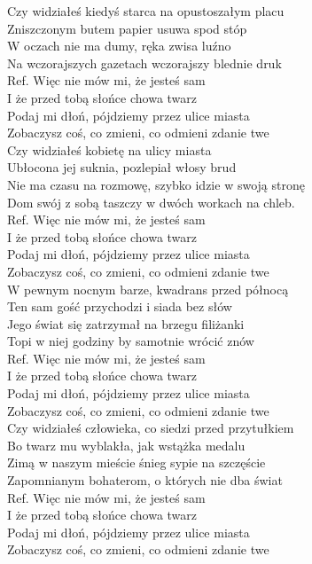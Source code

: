 
Czy widziałeś kiedyś starca na opustoszałym placu  \\
Zniszczonym butem papier usuwa spod stóp  \tab{} \\
W oczach nie ma dumy, ręka zwisa luźno  \tab{}  \\
Na wczorajszych gazetach wczorajszy blednie druk  \\
\hops
Ref. Więc nie mów mi, że jesteś sam  \tab{} \\
 I że przed tobą słońce chowa twarz  \tab{} \\
 Podaj mi dłoń, pójdziemy przez ulice miasta   \\
 Zobaczysz coś, co zmieni, co odmieni zdanie twe \\
\hops
Czy widziałeś kobietę na ulicy miasta \\
Ubłocona jej suknia, pozlepiał włosy brud \\
Nie ma czasu na rozmowę, szybko idzie w swoją stronę \\
Dom swój z sobą taszczy w dwóch workach na chleb. \\
\hops
Ref. Więc nie mów mi, że jesteś sam\\
 I że przed tobą słońce chowa twarz \\
 Podaj mi dłoń, pójdziemy przez ulice miasta \\
 Zobaczysz coś, co zmieni, co odmieni zdanie twe \\
\hops
W pewnym nocnym barze, kwadrans przed północą \\
Ten sam gość przychodzi i siada bez słów \\
Jego świat się zatrzymał na brzegu filiżanki \\
Topi w niej godziny by samotnie wrócić znów \\
\hops
Ref. Więc nie mów mi, że jesteś sam\\
 I że przed tobą słońce chowa twarz \\
 Podaj mi dłoń, pójdziemy przez ulice miasta \\
 Zobaczysz coś, co zmieni, co odmieni zdanie twe \\
\hops
Czy widziałeś człowieka, co siedzi przed przytułkiem \\
Bo twarz mu wyblakła,  jak wstążka medalu \\
Zimą w naszym mieście śnieg sypie na szczęście \\
Zapomnianym bohaterom, o których nie dba świat \\
\hops
Ref. Więc nie mów mi, że jesteś sam\\
 I że przed tobą słońce chowa twarz \\
 Podaj mi dłoń, pójdziemy przez ulice miasta \\
 Zobaczysz coś, co zmieni, co odmieni zdanie twe 